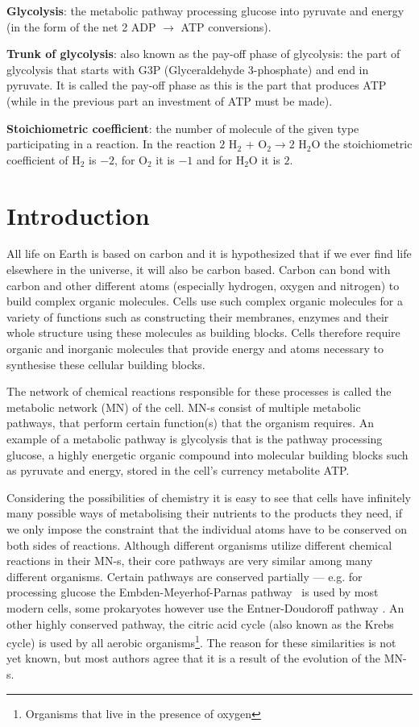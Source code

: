 \documentclass[a4paper,12pt]{article}
\begin{document}
\begin{framed}
	\textbf{Glycolysis}: the metabolic pathway processing glucose into pyruvate and energy (in the form of the net 2 ADP $\rightarrow$ ATP conversions).

	\textbf{Trunk of glycolysis}: also known as the pay-off phase of glycolysis: the part of glycolysis that starts with G3P (Glyceraldehyde 3-phosphate) and end in pyruvate. It is called the pay-off phase as this is the part that produces ATP (while in the previous part an investment of ATP must be made).
	
	\textbf{Stoichiometric coefficient}: the number of molecule of the given type participating in a reaction. In the reaction $2$ H$_2$ $+$ O$_2 \rightarrow 2$ H$_2$O the stoichiometric coefficient of H$_2$ is $-2$, for O$_2$ it is $-1$ and for H$_2$O it is $2$. 

	\end{framed}

	\newpage
	\section{Introduction}

	All life on Earth is based on carbon and it is hypothesized that if we ever find life elsewhere in the universe, it will also be carbon based. %
	Carbon can bond with carbon and other different atoms (especially hydrogen, oxygen and nitrogen) to build complex organic molecules. Cells use such complex organic molecules for a variety of functions such as constructing their membranes, enzymes and their whole structure using these molecules as building blocks. Cells therefore require organic and inorganic molecules that provide energy and atoms necessary to synthesise these cellular building blocks.

	The network of chemical reactions responsible for these processes is called the metabolic network (MN) of the cell. MN-s consist of multiple metabolic pathways, that perform certain function(s) that the organism requires. An example of a metabolic pathway is glycolysis that is the pathway processing glucose, a highly energetic organic compound into molecular building blocks such as pyruvate and energy, stored in the cell's currency metabolite ATP.
	
	Considering the possibilities of chemistry it is easy to see that cells have infinitely many possible ways of metabolising their nutrients to the products they need, if we only impose the constraint that the individual atoms have to be conserved on both sides of reactions. Although different organisms utilize different chemical reactions in their MN-s, their core pathways are very similar among many different organisms. Certain pathways are conserved partially --- e.g. for processing glucose the Embden-Meyerhof-Parnas pathway \cite{EMPpathway}~is used by most modern cells, some prokaryotes however use the Entner-Doudoroff pathway \cite{EDpathway}. An other highly conserved pathway, the citric acid cycle (also known as the Krebs cycle) is used by all aerobic organisms\footnote{Organisms that live in the presence of oxygen}.
	The reason for these similarities is not yet known, but most authors agree that it is a result of the evolution of the MN-s. 
\end{document}
